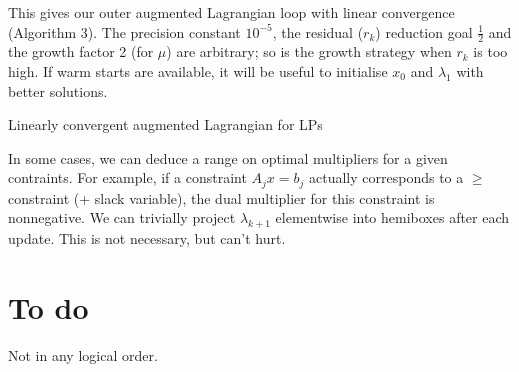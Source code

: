 \documentclass{article}
\begin{document}
This gives our outer augmented Lagrangian loop with linear convergence
(Algorithm 3).  The precision constant \(10^{-5}\), the residual
(\(r_k\)) reduction goal \(\frac{1}{2}\) and the growth factor 2 (for
\(\mu\)) are arbitrary; so is the growth strategy when \(r_k\) is too
high.  If warm starts are available, it will be useful to initialise
\(x_0\) and \(\lambda_1\) with better solutions.

\begin{algorithm}[h]
\caption{Linearly convergent augmented Lagrangian for LPs}
\begin{algorithmic}
\REPEAT
{}
\ELSE
\ENDIF
{}
\end{algorithmic}
\end{algorithm}

In some cases, we can deduce a range on optimal multipliers for a
given contraints.  For example, if a constraint \(A_j x = b_j\)
actually corresponds to a \(\geq\) constraint (+ slack variable), the
dual multiplier for this constraint is nonnegative.  We can trivially
project \(\lambda_{k+1}\) elementwise into hemiboxes after each
update.  This is not necessary, but can't hurt.

\section{To do}
Not in any logical order.
\end{document}
